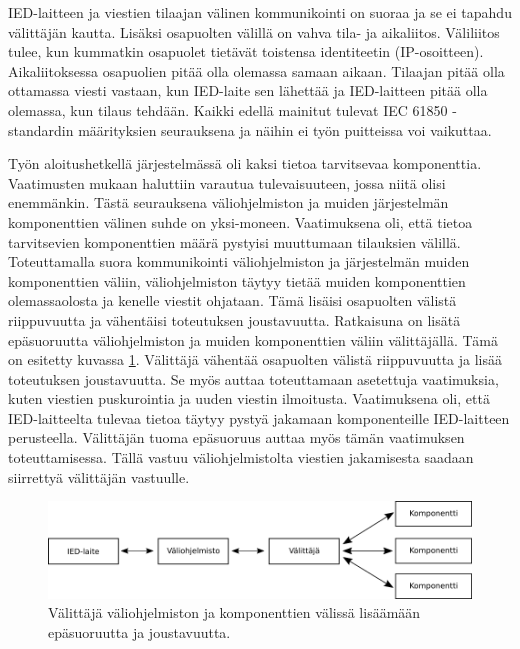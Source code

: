 IED-laitteen ja viestien tilaajan välinen kommunikointi on suoraa ja se ei tapahdu välittäjän kautta. Lisäksi osapuolten välillä on vahva tila- ja aikaliitos. Väliliitos tulee, kun kummatkin osapuolet tietävät toistensa identiteetin (IP-osoitteen). Aikaliitoksessa osapuolien pitää olla olemassa samaan aikaan. Tilaajan pitää olla ottamassa viesti vastaan, kun IED-laite sen lähettää ja IED-laitteen pitää olla olemassa, kun tilaus tehdään. Kaikki edellä mainitut tulevat IEC 61850 -standardin määrityksien seurauksena ja näihin ei työn puitteissa voi vaikuttaa.

Työn aloitushetkellä järjestelmässä oli kaksi tietoa tarvitsevaa komponenttia. Vaatimusten mukaan haluttiin varautua tulevaisuuteen, jossa niitä olisi enemmänkin. Tästä seurauksena väliohjelmiston ja muiden järjestelmän komponenttien välinen suhde on yksi-moneen. Vaatimuksena oli, että tietoa tarvitsevien komponenttien määrä pystyisi muuttumaan tilauksien välillä. Toteuttamalla suora kommunikointi väliohjelmiston ja järjestelmän muiden komponenttien väliin, väliohjelmiston täytyy tietää muiden komponenttien olemassaolosta ja kenelle viestit ohjataan. Tämä lisäisi osapuolten välistä riippuvuutta ja vähentäisi toteutuksen joustavuutta. Ratkaisuna on lisätä epäsuoruutta väliohjelmiston ja muiden komponenttien väliin välittäjällä. Tämä on esitetty kuvassa \ref{fig:coupling-analysis}. Välittäjä vähentää osapuolten välistä riippuvuutta ja lisää toteutuksen joustavuutta. Se myös auttaa toteuttamaan asetettuja vaatimuksia, kuten viestien puskurointia ja uuden viestin ilmoitusta. Vaatimuksena oli, että IED-laitteelta tulevaa tietoa täytyy pystyä jakamaan komponenteille IED-laitteen perusteella. Välittäjän tuoma epäsuoruus auttaa myös tämän vaatimuksen toteuttamisessa. Tällä vastuu väliohjelmistolta viestien jakamisesta saadaan siirrettyä välittäjän vastuulle.

\begin{figure}[ht!]
	\includegraphics[width=1\textwidth]{pictures/coupling-analysis.png}
	\caption{Välittäjä väliohjelmiston ja komponenttien välissä lisäämään epäsuoruutta ja joustavuutta.}
	\label{fig:coupling-analysis}
\end{figure}

